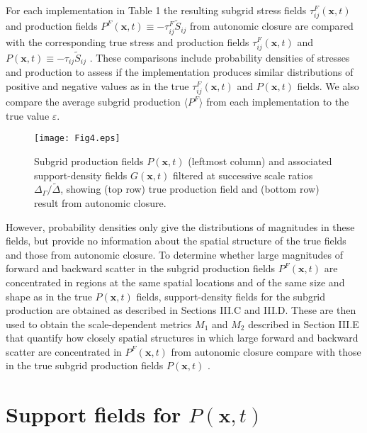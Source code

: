 For each implementation in Table 1 the resulting subgrid stress fields  $\tau_{ij}^{F}(\mathbf{x},t)$   and production fields $P^{F}(\mathbf{x},t) \equiv -\tau_{ij}^{F} \widetilde{S}_{ij}$ from autonomic closure are compared with the corresponding true stress and production fields  $\tau_{ij}^{F}(\mathbf{x},t)$  and $P(\mathbf{x},t) \equiv -\tau_{ij} \widetilde{S}_{ij}$  . These comparisons include probability densities of stresses and production to assess if the implementation produces similar distributions of positive and negative values as in the true $\tau_{ij}^{F}(\mathbf{x},t)$  and  $P(\mathbf{x},t)$ fields. We also compare the average subgrid production $\langle P^F \rangle$  from each implementation to the true value $\varepsilon$.

%
\begin{figure}
	\begin{center}
	\texttt{[image: Fig4.eps]}
	\caption{ Subgrid production fields $P(\mathbf{x},t)$ (leftmost column) and associated support-density fields $G(\mathbf{x},t)$ filtered at successive scale ratios $\Delta_{\Gamma}/\widetilde{\Delta}$, showing (top row) true production field and (bottom row) result from autonomic closure. }
	\label{F:4}
	\end{center}
\end{figure}
%
%
However, probability densities only give the distributions of magnitudes in these fields, but provide no information about the spatial structure of the true fields and those from autonomic closure. To determine whether large magnitudes of forward and backward scatter in the subgrid production fields $P^{F}(\mathbf{x},t)$  are concentrated in regions at the same spatial locations and of the same size and shape as in the true $P(\mathbf{x},t)$  fields, support-density fields for the subgrid production are obtained as described in Sections III.C and III.D. These are then used to obtain the scale-dependent metrics $M_1$  and $M_2$  described in Section III.E that quantify how closely spatial structures in which large forward and backward scatter are concentrated in $P^{F}(\mathbf{x},t)$  from autonomic closure compare with those in the true subgrid production fields $P(\mathbf{x},t)$ .


\section{Support fields for $P(\mathbf{x},t)$} 

